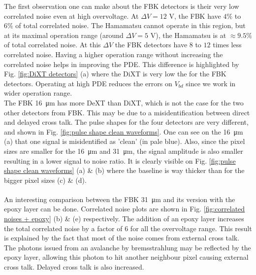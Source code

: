 The first observation one can make about the FBK detectors is their very low correlated noise even at high overvoltage. At $\Delta V= 12$ V, the FBK have $4\%$ to $6\%$ of total correlated noise. The Hamamatsu cannot operate in this region, but at its maximal operation range (around $\Delta V= 5$ V), the Hamamatsu is at $\approx 9.5\%$ of total correlated noise. At this $\Delta V$ the FBK detectors have $8$ to $12$ times less correlated noise. Having a higher operation range without increasing the correlated noise helps in improving the PDE. This difference is highlighted by Fig. \ref{fig:DiXT detectors} (a) where the DiXT is very low the for the FBK detectors. Operating at high PDE reduces the errors on $V_{bd}$ since we work in wider operation range. 
\\
The FBK \SI{16}{\micro m} has more DeXT than DiXT, which is not the case for the two other detectors from FBK. This may be due to a misidentification between direct and delayed cross talk. The pulse shapes for the four detectors are very different, and shown in Fig. \ref{fig:pulse shape clean waveforms}. One can see on the \SI{16}{\micro m} (a) that one signal is misidentified as 'clean' (in pale blue). Also, since the pixel sizes are smaller for the \SI{16}{\micro m} and \SI{31}{\micro m}, the signal amplitude is also smaller resulting in a lower signal to noise ratio. It is clearly visible on Fig. \ref{fig:pulse shape clean waveforms} (a) \& (b) where the baseline is way thicker than for the bigger pixel sizes (c) \& (d).\\ 
\\
An interesting comparison between the FBK \SI{31}{\micro m} and its version with the epoxy layer can be done. Correlated noise plots are shown in Fig. \ref{fig:correlated noises + epoxy} (b) \& (e) respectively. The addition of an epoxy layer increases the total correlated noise by a factor of $6$ for all the overvoltage range. This result is explained by the fact that most of the noise comes from external cross talk. The photons issued from an avalanche by bremsstrahlung may be reflected by the epoxy layer, allowing this photon to hit another neighbour pixel causing external cross talk. Delayed cross talk is also increased.


